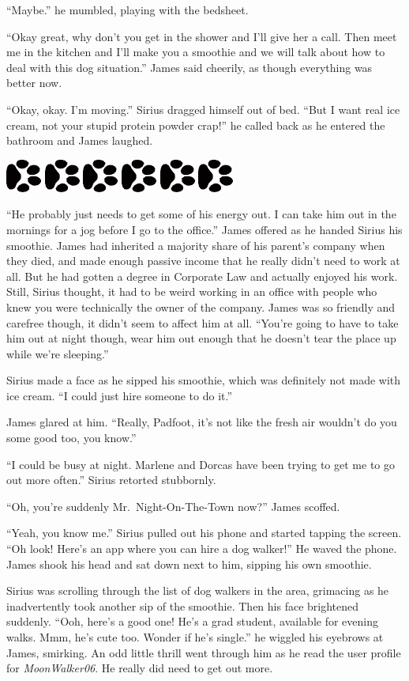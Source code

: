 \documentclass[12pt,twoside,openright]{memoir}
\newcommand{\dogPrintRule}{	
	\begin{center}
		\hspace{.5em}
		\includegraphics[angle=60]{dogprint.pdf}
		\hspace{.5em}
		\includegraphics[angle=120]{dogprint.pdf}
		\hspace{.5em}
		\includegraphics[angle=60]{dogprint.pdf}
		\hspace{.5em}
		\includegraphics[angle=120]{dogprint.pdf}
		\hspace{.5em}
		\includegraphics[angle=60]{dogprint.pdf}
		\hspace{.5em}
		\includegraphics[angle=120]{dogprint.pdf}
		\hspace{.5em}
	\end{center}
}
\begin{document}
``Maybe.'' he mumbled, playing with the bedsheet. 

``Okay great, why don't you get in the shower and I'll give her a call. Then meet me in the kitchen and I'll make you a smoothie and we will talk about how to deal with this dog situation.'' James said cheerily, as though everything was better now. 

``Okay, okay. I'm moving.'' Sirius dragged himself out of bed. ``But I want real ice cream, not your stupid protein powder crap!'' he called back as he entered the bathroom and James laughed.

\dogPrintRule

``He probably just needs to get some of his energy out. I can take him out in the mornings for a jog before I go to the office.'' James offered as he handed Sirius his smoothie. James had inherited a majority share of his parent's company when they died, and made enough passive income that he really didn't need to work at all. But he had gotten a degree in Corporate Law and actually enjoyed his work. Still, Sirius thought, it had to be weird working in an office with people who knew you were technically the owner of the company. James was so friendly and carefree though, it didn't seem to affect him at all. ``You're going to have to take him out at night though, wear him out enough that he doesn't tear the place up while we're sleeping.''

Sirius made a face as he sipped his smoothie, which was definitely not made with ice cream. ``I could just hire someone to do it.''

James glared at him. ``Really, Padfoot, it's not like the fresh air wouldn't do you some good too, you know.''

``I could be busy at night. Marlene and Dorcas have been trying to get me to go out more often.'' Sirius retorted stubbornly.

``Oh, you're suddenly Mr.\ Night-On-The-Town now?'' James scoffed.

``Yeah, you know me.'' Sirius pulled out his phone and started tapping the screen. ``Oh look! Here's an app where you can hire a dog walker!'' He waved the phone. James shook his head and sat down next to him, sipping his own smoothie.

Sirius was scrolling through the list of dog walkers in the area, grimacing as he inadvertently took another sip of the smoothie. Then his face brightened suddenly. ``Ooh, here's a good one! He's a grad student, available for evening walks. Mmm, he's cute too. Wonder if he's single.'' he wiggled his eyebrows at James, smirking. An odd little thrill went through him as he read the user profile for \textit{MoonWalker06}. He really did need to get out more.
\end{document}
